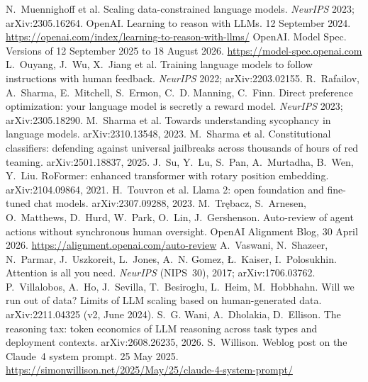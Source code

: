  N.~Muennighoff et al. Scaling data-constrained language models. \emph{NeurIPS} 2023; arXiv:2305.16264.
 OpenAI. Learning to reason with LLMs. 12 September 2024. \url{https://openai.com/index/learning-to-reason-with-llms/}
 OpenAI. Model Spec. Versions of 12 September 2025 to 18 August 2026. \url{https://model-spec.openai.com}
 L.~Ouyang, J.~Wu, X.~Jiang et al. Training language models to follow instructions with human feedback. \emph{NeurIPS} 2022; arXiv:2203.02155.
 R.~Rafailov, A.~Sharma, E.~Mitchell, S.~Ermon, C.~D. Manning, C.~Finn. Direct preference optimization: your language model is secretly a reward model. \emph{NeurIPS} 2023; arXiv:2305.18290.
 M.~Sharma et al. Towards understanding sycophancy in language models. arXiv:2310.13548, 2023.
 M.~Sharma et al. Constitutional classifiers: defending against universal jailbreaks across thousands of hours of red teaming. arXiv:2501.18837, 2025.
 J.~Su, Y.~Lu, S.~Pan, A.~Murtadha, B.~Wen, Y.~Liu. RoFormer: enhanced transformer with rotary position embedding. arXiv:2104.09864, 2021.
 H.~Touvron et al. Llama 2: open foundation and fine-tuned chat models. arXiv:2307.09288, 2023.
 M.~Tr{\k e}bacz, S.~Arnesen, O.~Matthews, D.~Hurd, W.~Park, O.~Lin, J.~Gershenson. Auto-review of agent actions without synchronous human oversight. OpenAI Alignment Blog, 30 April 2026. \url{https://alignment.openai.com/auto-review}
 A.~Vaswani, N.~Shazeer, N.~Parmar, J.~Uszkoreit, L.~Jones, A.~N. Gomez, {\L}.~Kaiser, I.~Polosukhin. Attention is all you need. \emph{NeurIPS} (NIPS~30), 2017; arXiv:1706.03762.
 P.~Villalobos, A.~Ho, J.~Sevilla, T.~Besiroglu, L.~Heim, M.~Hobbhahn. Will we run out of data? Limits of LLM scaling based on human-generated data. arXiv:2211.04325 (v2, June 2024).
 S.~G. Wani, A.~Dholakia, D.~Ellison. The reasoning tax: token economics of LLM reasoning across task types and deployment contexts. arXiv:2608.26235, 2026.
 S.~Willison. Weblog post on the Claude~4 system prompt. 25 May 2025. \url{https://simonwillison.net/2025/May/25/claude-4-system-prompt/}

